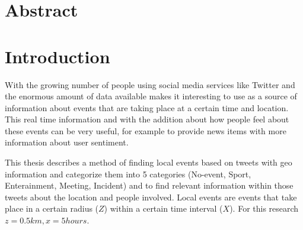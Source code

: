 \documentclass[
10pt, %
a4paper, %
oneside, %
headinclude,footinclude, %
BCOR5mm, %
]{scrartcl}
\begin{document}


\clearpage
\section*{Abstract} %

\lipsum[1] %



\newpage %


\section{Introduction}

With the growing number of people using social media services like Twitter and the enormous amount of data available makes it interesting to use as a source of information about events that are taking place at a certain time and location. This real time information and with the addition about how people feel about these events can be very useful, for example to provide news items with more information about user sentiment.

This thesis describes a method of finding local events based on tweets with geo information and categorize them into 5 categories (No-event, Sport, Enterainment, Meeting, Incident) and to find relevant information within those tweets about the location and people involved. Local events are events that take place in a certain radius (\begin{math}Z\end{math}) within a certain time interval (\begin{math}X\end{math}). For this research \begin{math}z= 0.5km , x= 5 hours\end{math}.
\end{document}
